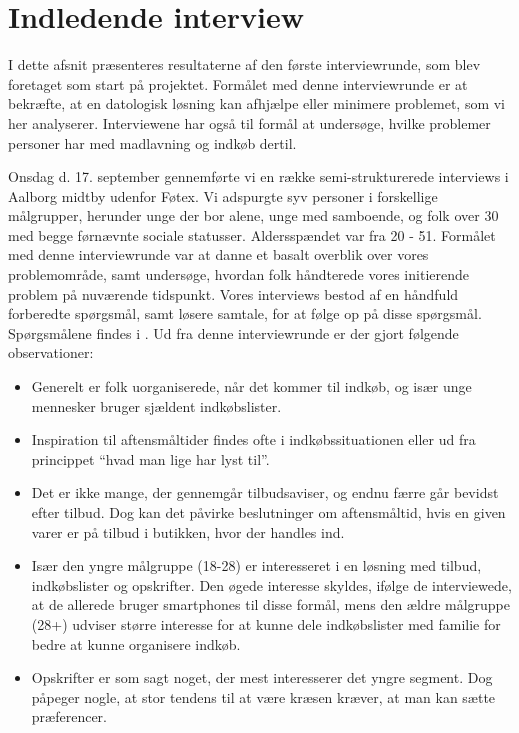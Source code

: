 \section{Indledende interview}\label{section:interview1}
I dette afsnit præsenteres resultaterne af den første interviewrunde, som blev foretaget som start på projektet.
Formålet med denne interviewrunde er at bekræfte, at en datologisk løsning kan afhjælpe eller minimere problemet, som vi her analyserer.
Interviewene har også til formål at undersøge, hvilke problemer personer har med madlavning og indkøb dertil.

Onsdag d. 17. september gennemførte vi en række semi-strukturerede interviews i Aalborg midtby udenfor Føtex.
Vi adspurgte syv personer i forskellige målgrupper, herunder unge der bor alene, unge med samboende, og folk over 30 med begge førnævnte sociale statusser.
Aldersspændet var fra 20 - 51.
Formålet med denne interviewrunde var at danne et basalt overblik over vores problemområde, samt undersøge, hvordan folk håndterede vores initierende problem på nuværende tidspunkt.
Vores interviews bestod af en håndfuld forberedte spørgsmål, samt løsere samtale, for at følge op på disse spørgsmål.
Spørgsmålene findes i .
Ud fra denne interviewrunde er der gjort følgende observationer:
\begin{itemize}
	\item Generelt er folk uorganiserede, når det kommer til indkøb, og især unge mennesker bruger sjældent indkøbslister.
	\item Inspiration til aftensmåltider findes ofte i indkøbssituationen eller ud fra princippet ``hvad man lige har lyst til''.
	\item Det er ikke mange, der gennemgår tilbudsaviser, og endnu færre går bevidst efter tilbud.
	Dog kan det påvirke beslutninger om aftensmåltid, hvis en given varer er på tilbud i butikken, hvor der handles ind.
	\item Især den yngre målgruppe (18-28) er interesseret i en løsning med tilbud, indkøbslister og opskrifter. Den øgede interesse skyldes, ifølge de interviewede, at de allerede bruger smartphones til disse formål, mens den ældre målgruppe (28+) udviser større interesse for at kunne dele indkøbslister med familie for bedre at kunne organisere indkøb.
	\item Opskrifter er som sagt noget, der mest interesserer det yngre segment.
	Dog påpeger nogle, at stor tendens til at være kræsen kræver, at man kan sætte præferencer.
\end{itemize}

